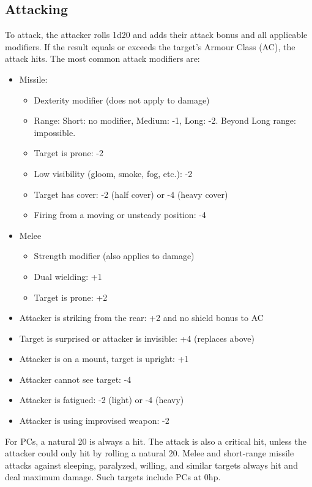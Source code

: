 \documentclass{book}
\providecommand{\tightlist}{%
\setlength{\itemsep}{0pt}\setlength{\parskip}{0pt}}
\begin{document}
\subsection*{Attacking}\label{attacking}

To attack, the attacker rolls 1d20 and adds their attack bonus and all
applicable modifiers. If the result equals or exceeds the target's
Armour Class (AC), the attack hits. The most common attack modifiers
are:

\begin{itemize}
\tightlist
\item
  Missile:

  \begin{itemize}
  \tightlist
  \item
    Dexterity modifier (does not apply to damage)
  \item
    Range: Short: no modifier, Medium: -1, Long: -2. Beyond Long range:
    impossible.
  \item
    Target is prone: -2
  \item
    Low visibility (gloom, smoke, fog, etc.): -2
  \item
    Target has cover: -2 (half cover) or -4 (heavy cover)
  \item
    Firing from a moving or unsteady position: -4
  \end{itemize}
\item
  Melee

  \begin{itemize}
  \tightlist
  \item
    Strength modifier (also applies to damage)
  \item
    Dual wielding: +1
  \item
    Target is prone: +2
  \end{itemize}
\item
  Attacker is striking from the rear: +2 and no shield bonus to AC
\item
  Target is surprised or attacker is invisible: +4 (replaces above)
\item
  Attacker is on a mount, target is upright: +1
\item
  Attacker cannot see target: -4
\item
  Attacker is fatigued: -2 (light) or -4 (heavy)
\item
  Attacker is using improvised weapon: -2
\end{itemize}

For PCs, a natural 20 is always a hit. The attack is also a critical
hit, unless the attacker could only hit by rolling a natural 20. Melee
and short-range missile attacks against sleeping, paralyzed, willing,
and similar targets always hit and deal maximum damage. Such targets
include PCs at 0hp.
\end{document}
